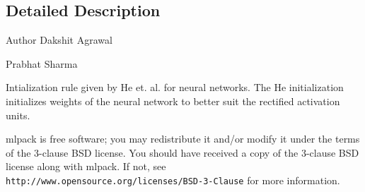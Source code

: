 \subsection{Detailed Description}
\begin{DoxyAuthor}{Author}
Dakshit Agrawal 

Prabhat Sharma
\end{DoxyAuthor}
Intialization rule given by He et. al. for neural networks. The He initialization initializes weights of the neural network to better suit the rectified activation units.

mlpack is free software; you may redistribute it and/or modify it under the terms of the 3-\/clause B\+SD license. You should have received a copy of the 3-\/clause B\+SD license along with mlpack. If not, see {\tt http\+://www.\+opensource.\+org/licenses/\+B\+S\+D-\/3-\/\+Clause} for more information. 